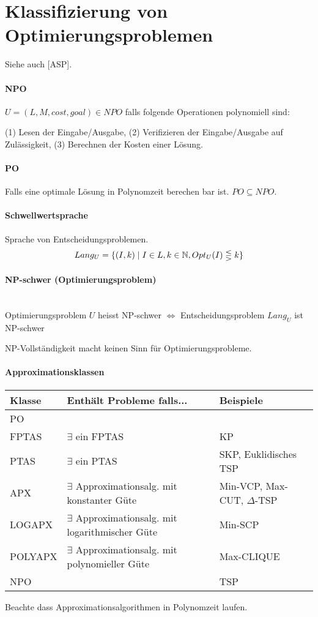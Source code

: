 \section{Klassifizierung von Optimierungsproblemen}

Siehe auch [ASP].

\paragraph{NPO}
$U = (L, M, cost, goal) \in NPO$ falls folgende Operationen polynomiell sind:

(1) Lesen der Eingabe/Ausgabe, (2) Verifizieren der Eingabe/Ausgabe auf Zulässigkeit,
(3) Berechnen der Kosten einer Lösung.

\paragraph{PO} Falls eine optimale Lösung in Polynomzeit berechen bar ist. $PO \subseteq NPO$.

\paragraph{Schwellwertsprache}
Sprache von Entscheidungsproblemen.
$$ Lang_U = \{ (I,k) \; | \; I \in L, k \in \mathbb{N}, Opt_U(I) \lesseqgtr  k\} $$

\paragraph{NP-schwer (Optimierungsproblem)} \mbox{}\\
Optimierungsproblem $U$ heisst NP-schwer $\iff$ Entscheidungsproblem $Lang_U$ ist NP-schwer

NP-Vollständigkeit macht keinen Sinn für Optimierungsprobleme.

\paragraph{Approximationsklassen} \mbox{}
\begin{table}[h]
    \centering
    \begin{tabular}{lll}
    Klasse & Enthält Probleme falls... & Beispiele \\ \hline
    PO & & \\
    FPTAS & $\exists$ ein FPTAS & KP \\
    PTAS & $\exists$ ein PTAS & SKP, Euklidisches TSP \\
    APX & $\exists$ Approximationsalg. mit konstanter Güte & Min-VCP, Max-CUT, $\Delta$-TSP \\
    LOGAPX & $\exists$ Approximationsalg. mit logarithmischer Güte & Min-SCP \\
    POLYAPX & $\exists$ Approximationsalg. mit polynomieller Güte & Max-CLIQUE \\
    NPO &  & TSP \\
    \end{tabular}
\end{table}
Beachte dass Approximationsalgorithmen in Polynomzeit laufen.
